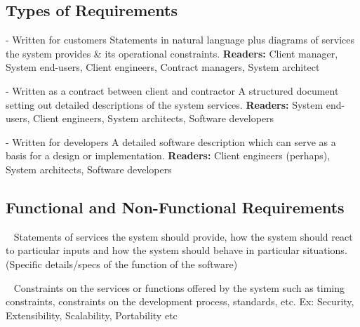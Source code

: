 \documentclass{article}
\begin{document}
\subsection{Types of Requirements}
\vspace{-6pt}
\begin{description}
  \setlength\itemsep{-.25em}
  \item [User requirements] - Written for customers\newline
  Statements in natural language plus diagrams of services the system provides \& its operational constraints.\newline
  \textbf{Readers:} Client manager, System end-users, Client engineers, Contract managers, System architect
  \item [System requirements] - Written as a contract between client and contractor \newline
  A structured document setting out detailed descriptions of the system services.\newline
  \textbf{Readers:} System end-users, Client engineers, System architects, Software developers
  \item [Software specification] - Written for developers \newline
  A detailed software description which can serve as a basis for a design or implementation. \newline
  \textbf{Readers:} Client engineers (perhaps), System architects, Software developers
\end{description}

\subsection{Functional and Non-Functional Requirements}
\vspace{-6pt}
\begin{description}
  \setlength\itemsep{-.25em}
  \item [Functional requirements] \ \newline
   Statements of services the system should provide, how the system should react to particular inputs and how the system should behave in particular situations. (Specific details/specs of the function of the software)
  \item [Non-Functional requirements] \ \newline
   Constraints on the services or functions offered by the system such as timing constraints, constraints on the development process, standards, etc. Ex: Security, Extensibility, Scalability, Portability etc
\end{description}
\end{document}
